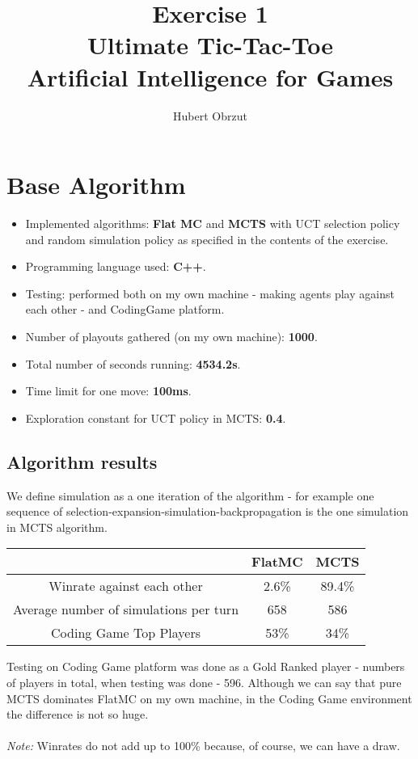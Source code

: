 \documentclass[11pt]{article}
\title{
	Exercise 1 \\
	Ultimate Tic-Tac-Toe \\
	Artificial Intelligence for Games \\
}
\author{Hubert Obrzut}
\begin{document}
	\maketitle
	
	\section{Base Algorithm}
	 \begin{itemize}
	 	\item Implemented algorithms: \textbf{Flat MC} and \textbf{MCTS} with UCT selection policy and random simulation policy as specified in the contents of the exercise.
	 	\item Programming language used: \textbf{C++}.
	 	\item Testing: performed both on my own machine - making agents play against each other - and CodingGame platform.
	 	\item Number of playouts gathered (on my own machine): \textbf{1000}.
	 	\item Total number of seconds running: \textbf{4534.2s}.
	 	\item Time limit for one move: \textbf{100ms}.
	 	\item Exploration constant for UCT policy in MCTS: \textbf{0.4}.
	 \end{itemize}
	 \subsection{Algorithm results}
	 We define simulation as a one iteration of the algorithm - for example one sequence of selection-expansion-simulation-backpropagation is the one simulation in MCTS algorithm. 
	 \begin{center}
		 \begin{tabular}{| c | c | c |}
		 \hline
		  & FlatMC & MCTS \\ \hline
		  Winrate against each other & 2.6\% & 89.4\% \\ \hline
		  Average number of simulations per turn & 658 & 586 \\ \hline
		  Coding Game Top Players & 53\% & 34\% \\ \hline
		 \end{tabular}
	 \end{center}
	 Testing on Coding Game platform was done as a Gold Ranked player - numbers of players in total, when testing was done - 596. Although we can say that pure MCTS dominates FlatMC on my own machine, in the Coding Game environment the difference is not so huge. \\\\
	\textit{Note:} Winrates do not add up to 100\% because, of course, we can have a draw.
	
\end{document}
